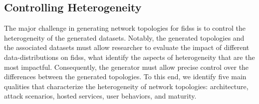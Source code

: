 \subsection{Controlling Heterogeneity\label{sec:topologies.req.heterog}}

The major challenge in generating network topologies for \glspl{fids} is to control the heterogeneity of the generated datasets.
Notably, the generated topologies and the associated datasets must allow researcher to evaluate the impact of different data-distributions on \glspl{fids}, what identify the aspects of heterogeneity that are the most impactful.
Consequently, the generator must allow precise control over the differences between the generated topologies.
To this end, we identify five main qualities that characterize the heterogeneity of network topologies: architecture, attack scenarios, hosted services, user behaviors, and maturity.

